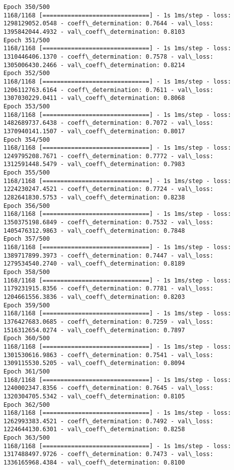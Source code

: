 \documentclass[11pt]{article}
\begin{document}
\begin{Verbatim}[commandchars=\\\{\}]
Epoch 350/500
1168/1168 [==============================] - 1s 1ms/step - loss: 1298129052.0548 - coeff\_determination: 0.7644 - val\_loss: 1395842044.4932 - val\_coeff\_determination: 0.8103
Epoch 351/500
1168/1168 [==============================] - 1s 1ms/step - loss: 1310446406.1370 - coeff\_determination: 0.7578 - val\_loss: 1305006430.2466 - val\_coeff\_determination: 0.8214
Epoch 352/500
1168/1168 [==============================] - 1s 1ms/step - loss: 1206112763.6164 - coeff\_determination: 0.7611 - val\_loss: 1307030229.0411 - val\_coeff\_determination: 0.8068
Epoch 353/500
1168/1168 [==============================] - 1s 1ms/step - loss: 1482689737.6438 - coeff\_determination: 0.7072 - val\_loss: 1370940141.1507 - val\_coeff\_determination: 0.8017
Epoch 354/500
1168/1168 [==============================] - 1s 1ms/step - loss: 1249795208.7671 - coeff\_determination: 0.7772 - val\_loss: 1312591448.5479 - val\_coeff\_determination: 0.7983
Epoch 355/500
1168/1168 [==============================] - 1s 1ms/step - loss: 1224230247.4521 - coeff\_determination: 0.7724 - val\_loss: 1282641830.5753 - val\_coeff\_determination: 0.8238
Epoch 356/500
1168/1168 [==============================] - 1s 1ms/step - loss: 1350375198.6849 - coeff\_determination: 0.7532 - val\_loss: 1405476312.9863 - val\_coeff\_determination: 0.7848
Epoch 357/500
1168/1168 [==============================] - 1s 1ms/step - loss: 1389717899.3973 - coeff\_determination: 0.7447 - val\_loss: 1279534540.2740 - val\_coeff\_determination: 0.8189
Epoch 358/500
1168/1168 [==============================] - 1s 1ms/step - loss: 1179231915.8356 - coeff\_determination: 0.7781 - val\_loss: 1204661556.3836 - val\_coeff\_determination: 0.8203
Epoch 359/500
1168/1168 [==============================] - 1s 1ms/step - loss: 1376427683.0685 - coeff\_determination: 0.7259 - val\_loss: 1516312654.0274 - val\_coeff\_determination: 0.7897
Epoch 360/500
1168/1168 [==============================] - 1s 1ms/step - loss: 1301530616.9863 - coeff\_determination: 0.7541 - val\_loss: 1309115530.5205 - val\_coeff\_determination: 0.8094
Epoch 361/500
1168/1168 [==============================] - 1s 1ms/step - loss: 1240002347.8356 - coeff\_determination: 0.7645 - val\_loss: 1320304705.5342 - val\_coeff\_determination: 0.8105
Epoch 362/500
1168/1168 [==============================] - 1s 1ms/step - loss: 1262993383.4521 - coeff\_determination: 0.7492 - val\_loss: 1224644130.6301 - val\_coeff\_determination: 0.8258
Epoch 363/500
1168/1168 [==============================] - 1s 1ms/step - loss: 1317488497.9726 - coeff\_determination: 0.7473 - val\_loss: 1336165968.4384 - val\_coeff\_determination: 0.8100

\end{Verbatim}
\end{document}
